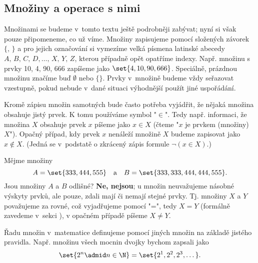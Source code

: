 \subsection{Množiny a operace s nimi}\label{subsec:mnoziny_a_operace_s_nimi}

Množinami se budeme v~tomto textu ještě podrobněji zabývat; nyní si však pouze připomeneme, co už víme. Množiny zapisujeme pomocí složených závorek $\{,\,\}$ a pro jejich označování si vymezíme velká písmena latinské abecedy\linebreak $A,\,B,\,C,\,D,\dots,\,X,\,Y,\,Z$, kterou případně opět opatříme indexy. Např. množinu s prvky 10, 4, 90, 666 zapíšeme jako $\set{4, 10, 90, 666}$. Speciálně, prázdnou množinu značíme buď $\emptyset$ nebo $\{\}$. Prvky v~množině budeme vždy seřazovat vzestupně, pokud nebude v~dané situaci výhodnější použít jiné uspořádání.\par
Kromě zápisu množin samotných bude často potřeba vyjádřit, že nějaká množina obsahuje jistý prvek. K tomu používáme symbol "$\in$". Tedy např. informaci, že množina $X$ obsahuje prvek $x$ píšeme jako $x\in X$ (čteme "$x$ je prvkem (množiny) $X$"). Opačný případ, kdy prvek $x$ nenáleží množině $X$ budeme zapisovat jako $x \notin X$. (Jedná se v~podstatě o zkrácený zápis formule $\neg (x \in X)$.)\par
Mějme množiny
\begin{equation*}
    A=\set{333, 444, 555}\quad\text{a}\quad B=\set{333, 333, 444, 444, 555}.
\end{equation*}
Jsou množiny $A$ a $B$ odlišné? \textbf{Ne, nejsou}; u množin neuvažujeme násobné výskyty prvků, ale pouze, zdali mají či nemají stejné prvky. Tj. množiny $X$ a $Y$ považujeme za rovné, což vyjadřujeme pomocí "=", tedy $X=Y$ (formálně zavedeme v~sekci ), v opačném případě píšeme $X \neq Y$.\par
Řadu množin v~matematice definujeme pomocí jiných množin na základě jistého pravidla. Např. množinu všech mocnin dvojky bychom zapsali jako
\begin{equation*}
    \set{2^n \admid n \in \N}=\set{2^1, 2^2, 2^3, \dots}.
\end{equation*}

